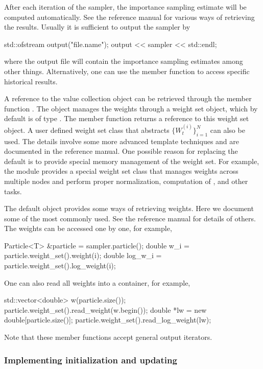 \documentclass[11pt, fontset=Minion, showoverfull,
bib, mintcode, minted=cache]{marticle}
\begin{document}
After each iteration of the sampler, the importance sampling estimate will be
computed automatically. See the reference manual for various ways of
retrieving the results. Usually it is sufficient to output the sampler by
\begin{cppcode}
std::ofstream output("file.name");
output << sampler << std::endl;
\end{cppcode}
where the output file will contain the importance sampling estimates among
other things. Alternatively, one can use the 
member function to access specific historical results.

A reference to the value collection  object can be retrieved
through the member function . The
 object manages the weights through a weight set
object, which by default is of type . The
 member function returns a reference to
this weight set object. A user defined weight set class that abstracts
$\{W_t^{(i)}\}_{i=1}^N$ can also be used. The details involve some more
advanced \cpp template techniques and are documented in the reference manual.
One possible reason for replacing the default is to provide special memory
management of the weight set. For example, the \mpi module provides a special
weight set class that manages weights across multiple nodes and perform proper
normalization, computation of \ess, and other tasks.

The default  object provides some ways of retrieving
weights.  Here we document some of the most commonly used. See the reference
manual for details of others. The weights can be accessed one by one, for
example,
\begin{cppcode}
Particle<T> &particle = sampler.particle();
double w_i     = particle.weight_set().weight(i);
double log_w_i = particle.weight_set().log_weight(i);
\end{cppcode}
One can also read all weights into a container, for example,
\begin{cppcode}
std::vector<double> w(particle.size());
particle.weight_set().read_weight(w.begin());
double *lw = new double[particle.size()];
particle.weight_set().read_log_weight(lw);
\end{cppcode}
Note that these member functions accept general output iterators.

\subsubsection{Implementing initialization and updating}
\end{document}
